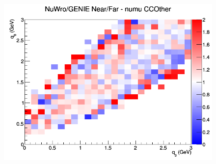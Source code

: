 \documentclass[12pt]{article}
\begin{document}
\begin{figure}[h]
\endminipage
{}
\includegraphics[width=\linewidth]{eff_q0_q3/GAr/ratios/CCOther_NuWro_GENIE_numu_NF_q3_q0.png}
\endminipage
\newline
\end{figure}
\clearpage
\end{document}
